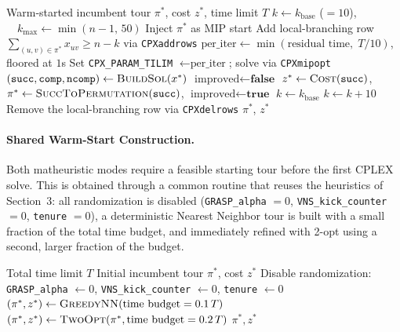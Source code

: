 \documentclass{article}
\begin{document}
\begin{algorithm}[H]
\caption{Local Branching Matheuristic (\texttt{TSPopt\_local\_branching})}
\label{alg:localbranching}
\begin{algorithmic}[1]
\Require Warm-started incumbent tour $\pi^*$, cost $z^*$, time limit $T$
\State $k \leftarrow k_{\text{base}}$ ($=10$), $\quad k_{\max} \leftarrow \min(n-1,\, 50)$
    \State Inject $\pi^*$ as MIP start
    \State Add local-branching row $\sum_{(u,v) \in \pi^*} x_{uv} \geq n - k$ via \texttt{CPXaddrows}
    \State $\text{per\_iter} \leftarrow \min(\text{residual time},\; T/10)$, floored at $1$s
    \State Set \texttt{CPX\_PARAM\_TILIM} $\leftarrow \text{per\_iter}$; solve via \texttt{CPXmipopt}
    \State $(\texttt{succ}, \texttt{comp}, \texttt{ncomp}) \leftarrow \textsc{BuildSol}(x^*)$
    \State $\text{improved} \leftarrow \textbf{false}$
        \State $z^* \leftarrow \textsc{Cost}(\texttt{succ})$, $\pi^* \leftarrow \textsc{SuccToPermutation}(\texttt{succ})$, $\text{improved} \leftarrow \textbf{true}$
    \EndIf
        \State $k \leftarrow k_{\text{base}}$ 
        \State $k \leftarrow k + 10$ 
    \EndIf
    \State Remove the local-branching row via \texttt{CPXdelrows}
\EndWhile
\State \Return $\pi^*$, $z^*$
\end{algorithmic}
\end{algorithm}

\paragraph{Shared Warm-Start Construction.}
Both matheuristic modes require a feasible starting tour before the first CPLEX solve. This is
obtained through a common routine that reuses the heuristics of Section~3: all randomization is
disabled (\texttt{GRASP\_alpha} $= 0$, \texttt{VNS\_kick\_counter} $= 0$, \texttt{tenure} $= 0$),
a deterministic Nearest Neighbor tour is built with a small fraction of the total time budget,
and immediately refined with 2-opt using a second, larger fraction of the budget.

\begin{algorithm}[H]
\caption{Shared Warm-Start Construction (\texttt{matheuristic\_warm\_start})}
\label{alg:warmstart}
\begin{algorithmic}[1]
\Require Total time limit $T$
\Ensure Initial incumbent tour $\pi^*$, cost $z^*$
\State Disable randomization: \texttt{GRASP\_alpha} $\leftarrow 0$, \texttt{VNS\_kick\_counter} $\leftarrow 0$, \texttt{tenure} $\leftarrow 0$
\State $(\pi^*, z^*) \leftarrow \textsc{GreedyNN}(\text{time budget} = 0.1\,T)$
\State $(\pi^*, z^*) \leftarrow \textsc{TwoOpt}(\pi^*, \text{time budget} = 0.2\,T)$
\State \Return $\pi^*, z^*$
\end{algorithmic}
\end{algorithm}
\end{document}
